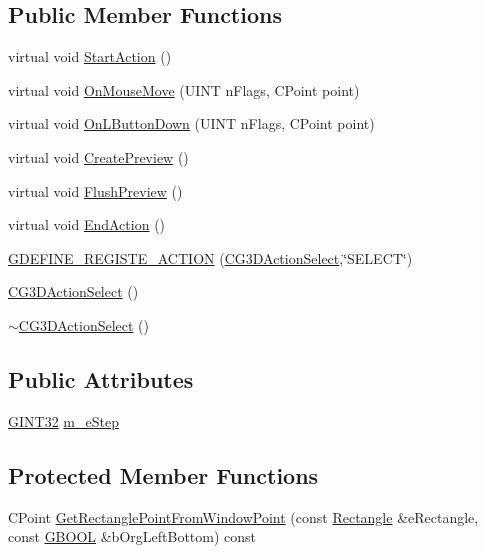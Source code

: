 \subsection*{Public Member Functions}
\begin{DoxyCompactItemize}
\item 
virtual void \hyperlink{class_c_g3_d_action_select_a45e05f0516abe52906246744a548f003}{Start\+Action} ()
\item 
virtual void \hyperlink{class_c_g3_d_action_select_a570c8779b8f11cf26c8d62356d6ad1d2}{On\+Mouse\+Move} (U\+I\+N\+T n\+Flags, C\+Point point)
\item 
virtual void \hyperlink{class_c_g3_d_action_select_a089552c6ce2adaf337602973fd98d84a}{On\+L\+Button\+Down} (U\+I\+N\+T n\+Flags, C\+Point point)
\item 
virtual void \hyperlink{class_c_g3_d_action_select_a563c0a69d516cc5b1496c3d45adf9ba9}{Create\+Preview} ()
\item 
virtual void \hyperlink{class_c_g3_d_action_select_a94b802dcbc46ec98b4e7df0b563bdf1b}{Flush\+Preview} ()
\item 
virtual void \hyperlink{class_c_g3_d_action_select_adddb97c8edb1f085ce52ea7a102fad6d}{End\+Action} ()
\item 
\hyperlink{class_c_g3_d_action_select_a9906347685735ec690ee4366852ac24c}{G\+D\+E\+F\+I\+N\+E\+\_\+\+R\+E\+G\+I\+S\+T\+E\+\_\+\+A\+C\+T\+I\+O\+N} (\hyperlink{class_c_g3_d_action_select}{C\+G3\+D\+Action\+Select},\char`\"{}S\+E\+L\+E\+C\+T\char`\"{})
\item 
\hyperlink{class_c_g3_d_action_select_a62e2d1d2fc7782ffcb9200ea6ac9173c}{C\+G3\+D\+Action\+Select} ()
\item 
\hyperlink{class_c_g3_d_action_select_ad4082883205c8f14c026cd4c526cb1d3}{$\sim$\+C\+G3\+D\+Action\+Select} ()
\end{DoxyCompactItemize}
\subsection*{Public Attributes}
\begin{DoxyCompactItemize}
\item 
\hyperlink{_g_types_8h_a40d8bc7c06b9e72906852691a4bf888e}{G\+I\+N\+T32} \hyperlink{class_c_g3_d_action_select_a915dc96ca5bdc7002573f4b2c7e6e3b5}{m\+\_\+e\+Step}
\end{DoxyCompactItemize}
\subsection*{Protected Member Functions}
\begin{DoxyCompactItemize}
\item 
C\+Point \hyperlink{class_c_g3_d_action_select_adc6ac86928c7f0e8a57a9b80cec92fb8}{Get\+Rectangle\+Point\+From\+Window\+Point} (const \hyperlink{class_c_g3_d_action_select_aab1b3255643c94752ce09839f17ebd9c}{Rectangle} \&e\+Rectangle, const \hyperlink{_g_types_8h_a2901915743626352a6820c5405f556dc}{G\+B\+O\+O\+L} \&b\+Org\+Left\+Bottom) const 
\end{DoxyCompactItemize}
